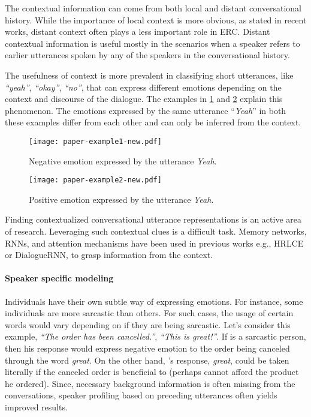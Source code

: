\documentclass{IEEEtran}\usepackage[pdftex]{graphicx}
\begin{document}
	The contextual information can come from both local and distant conversational history. While the importance of local context is more obvious, as stated in  recent works, distant context often plays a less important role in ERC. Distant contextual information is useful mostly in the scenarios when a speaker refers to earlier utterances spoken by any of the speakers in the conversational history.
	
	The usefulness of context is more prevalent in classifying short utterances, like {\it ``yeah''}, {\it ``okay''}, {\it ``no''}, that
	can express different emotions depending on the context and discourse of the dialogue. The examples in \cref{fig:context1} and \cref{fig:context2} explain this phenomenon. The emotions expressed by the same utterance ``\emph{Yeah}'' in both these examples differ from each other and can only be inferred from the context. 
	
	\begin{figure*}[!htbp]
		\centering
		\begin{subfigure}{0.49\textwidth}
			\centering
			\texttt{[image: paper-example1-new.pdf]}
			\caption{Negative emotion expressed by the utterance \emph{Yeah}.}
			\label{fig:context1}
		\end{subfigure}
		\begin{subfigure}{0.49\textwidth}
			\centering
			\texttt{[image: paper-example2-new.pdf]}
			\caption{Positive emotion expressed by the utterance \emph{Yeah}.}
			\label{fig:context2}
		\end{subfigure}\caption{Role of context in emotion recognition in conversation.}
	\end{figure*}
	Finding contextualized conversational utterance representations is an active area of research. Leveraging such contextual clues is a difficult task. Memory networks, RNNs, and attention mechanisms have been used in previous works e.g., HRLCE or DialogueRNN, to grasp information from the context.
	
	\paragraph{Speaker specific modeling}
	
	Individuals have their own subtle way of expressing emotions. For instance, some individuals are more sarcastic than
	others. For such cases, the usage of certain words would vary depending on if they are being sarcastic. 
	Let's consider this example,  \textit{``The order has been cancelled.''},  \textit{``This is great!''}. If  is
	a sarcastic person, then his response would express negative emotion to the order being canceled through the word \textit{great}. On the other hand, 's
	response, \textit{great}, could be taken literally if the canceled order is beneficial to  (perhaps  cannot afford the product he ordered). Since, necessary background
	information is often missing from the conversations, speaker profiling based on preceding utterances often yields improved
	results.
	
\end{document}
